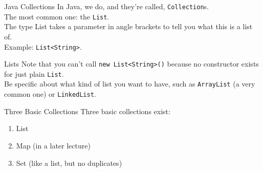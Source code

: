 \documentclass{beamer}
\begin{document}
\begin{frame}{Java Collections}
In Java, we do, and they're called, \texttt{Collection}s. \\
\vspace{0.5em}
The most common one: the \texttt{List}.  \\
\vspace{0.5em}
The type List takes a parameter in angle brackets to tell you what this is a list of. \\
\vspace{0.5em}
Example: \texttt{List<String>}. \\
\end{frame}



\begin{frame}{Lists}
Note that you can't call \texttt{new List<String>()} because no constructor exists for just plain \texttt{List}. \\
\vspace{0.5em}
Be specific about what kind of list you want to have, such as \texttt{ArrayList} (a very common one) or \texttt{LinkedList}. \\
\end{frame}



\begin{frame}{Three Basic Collections}
Three basic collections exist: \\
\vspace{0.5em}
\begin{enumerate}
	\item List
	\item Map (in a later lecture)
	\item Set (like a list, but no duplicates)
\end{enumerate}
\end{frame}
\end{document}
